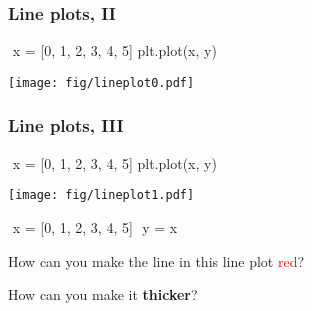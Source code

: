 \documentclass[english,serif,mathserif,xcolor=pdftex,dvipsnames,table]{beamer}
\begin{document}
\begin{frame}[fragile]
  \frametitle{Line plots, II}
\begin{semiverbatim}\small
\In \,\,x = [0, 1, 2, 3, 4, 5]
\In {}
\In plt.plot(x, y)
\end{semiverbatim}
  \begin{center}
    \texttt{[image: fig/lineplot0.pdf]}
  \end{center}
\end{frame}


\begin{frame}[fragile]
  \frametitle{Line plots, III}
\begin{semiverbatim}\small
\In \,\,x = [0, 1, 2, 3, 4, 5]
\In {}
\In plt.plot(x, y)
\end{semiverbatim}
  \begin{center}
    \texttt{[image: fig/lineplot1.pdf]}
  \end{center}
\end{frame}


\begin{frame}[fragile]
  \begin{exercise*}[3.G]

\begin{semiverbatim}\small
\In \,\,x = [0, 1, 2, 3, 4, 5]
\In \,\,y = x
\In {}
\end{semiverbatim}

    How can you make the line in this line plot \textcolor{red}{red}?

    \+
    How can you make it \textbf{thicker}?
  \end{exercise*}
\end{frame}





\end{document}
